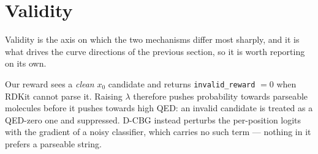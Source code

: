 \documentclass[11pt]{article}
\begin{document}
\section{Validity}\label{sec:validity-qed}

Validity is the axis on which the two mechanisms differ most sharply, and it is
what drives the curve directions of the previous section, so it is worth
reporting on its own.

Our reward sees a \emph{clean} $x_0$ candidate and returns
\texttt{invalid\_reward} $=0$ when RDKit cannot parse it. Raising $\lambda$
therefore pushes probability towards parseable molecules before it pushes
towards high QED: an invalid candidate is treated as a QED-zero one and
suppressed. D-CBG instead perturbs the per-position logits with the gradient of
a noisy classifier, which carries no such term --- nothing in it prefers a
parseable string.

\begin{table}[htbp]
\centering
\small
{}
\caption{MDLM, \texttt{marginal}: valid molecules out of the 1{,}024 generated.}
\label{tab:valid-qed-MDLM-marginal}
\end{table}
\end{document}
